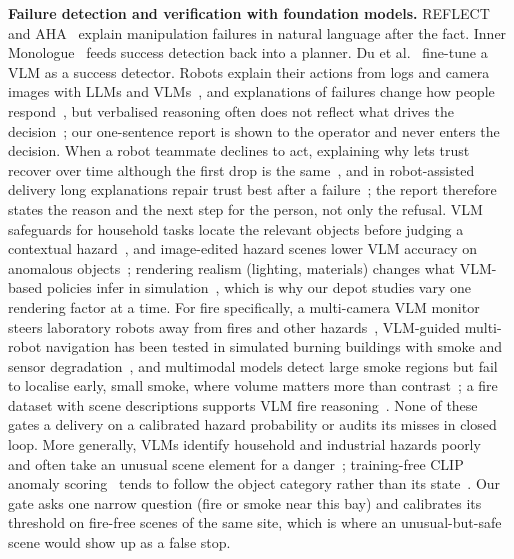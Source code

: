 \documentclass[conference]{IEEEtran}
\begin{document}
\textbf{Failure detection and verification with foundation models.}
REFLECT~\cite{liu2023reflect} and AHA~\cite{duan2025aha} explain manipulation failures in natural language
after the fact. Inner Monologue~\cite{huang2023innermonologue} feeds success detection back into a planner.
Du et al.\ \cite{du2023successdetectors} fine-tune a VLM as a success detector. Robots explain their actions from logs and camera images with LLMs and VLMs~\cite{sobrinhidalgo2024vlmexplain}, and explanations of failures change how people respond~\cite{khanna2023failureexplanation}, but verbalised reasoning often does not reflect what drives the decision~\cite{foutter2026faithfulness,balasubramanian2025cotfaithfulness}; our one-sentence report is shown to the operator and never enters the decision. When a robot teammate declines to act, explaining why lets trust recover over time although the first drop is the same~\cite{webb2025robotssayno}, and in robot-assisted delivery long explanations repair trust best after a failure~\cite{mangalindan2025deliverytrust}; the report therefore states the reason and the next step for the person, not only the refusal. VLM safeguards for household tasks locate the relevant objects before judging a contextual hazard~\cite{lu2026homeguard}, and image-edited hazard scenes lower VLM accuracy on anomalous objects~\cite{taniguchi2026hazardforge}; rendering realism (lighting, materials) changes what VLM-based policies infer in simulation~\cite{zhu2026viser}, which is why our depot studies vary one rendering factor at a time. For fire specifically, a multi-camera VLM monitor steers laboratory robots away from fires and other hazards~\cite{mungiagaleano2025chemisteye}, VLM-guided multi-robot navigation has been tested in simulated burning buildings with smoke and sensor degradation~\cite{liu2026vulcan}, and multimodal models detect large smoke regions but fail to localise early, small smoke, where volume matters more than contrast~\cite{qi2026smokebench}; a fire dataset with scene descriptions supports VLM fire reasoning~\cite{liu2025detectiumfire}. None of these gates a delivery on a calibrated hazard probability or audits its misses in closed loop. More generally, VLMs identify household and industrial hazards poorly~\cite{yu2026tsha,abdullah2025isafetybench} and often take an unusual scene element for a danger~\cite{indukuri2026hazardanomaly}; training-free CLIP anomaly scoring~\cite{jeong2023winclip} tends to follow the object category rather than its state~\cite{yuan2025afrclip}. Our gate asks one narrow question (fire or smoke near this bay) and calibrates its threshold on fire-free scenes of the same site, which is where an unusual-but-safe scene would show up as a false stop.
\end{document}
